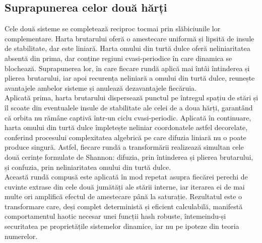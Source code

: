 \subsection{Suprapunerea celor două hărți}

Cele două sisteme se completează reciproc tocmai prin slăbiciunile lor complementare.
Harta brutarului oferă o amestecare uniformă și lipsită de insule de stabilitate, dar este liniară.
Harta omului din turtă dulce oferă neliniaritatea absentă din prima, dar conține regiuni cvasi-periodice în care dinamica se blochează.
Suprapunerea lor, în care fiecare rundă aplică mai întâi întinderea și plierea brutarului, iar apoi recurența neliniară a omului din turtă dulce, reunește avantajele ambelor sisteme și anulează dezavantajele fiecăruia. \\

Aplicată prima, harta brutarului dispersează punctul pe întregul spațiu de stări și îl scoate din eventualele insule de stabilitate ale celei de a doua hărți, garantând că orbita nu rămâne captivă într-un ciclu cvasi-periodic.
Aplicată în continuare, harta omului din turtă dulce împletește neliniar coordonatele astfel decorelate, conferind procesului complexitatea algebrică pe care difuzia liniară nu o poate produce singură.
Astfel, fiecare rundă a transformării realizează simultan cele două cerințe formulate de Shannon: difuzia, prin întinderea și plierea brutarului, și confuzia, prin neliniaritatea omului din turtă dulce. \\

Această rundă compusă este aplicată în mod repetat asupra fiecărei perechi de cuvinte extrase din cele două jumătăți ale stării interne, iar iterarea ei de mai multe ori amplifică efectul de amestecare până la saturație.
Rezultatul este o transformare care, deși complet deterministă și eficient calculabilă, manifestă comportamentul haotic necesar unei funcții hash robuste, întemeindu-și securitatea pe proprietățile sistemelor dinamice, iar nu pe ipoteze din teoria numerelor.

